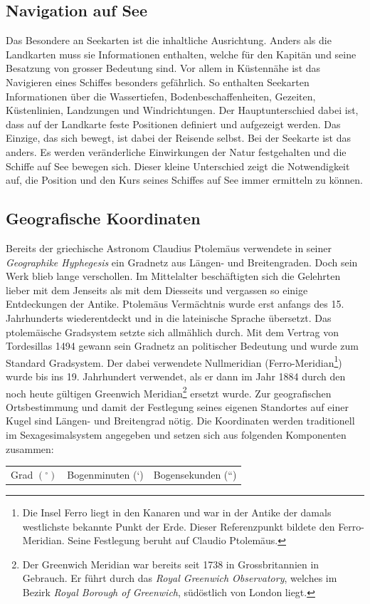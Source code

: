 \begin{refsection}
\section{Navigation auf See}
Das Besondere an Seekarten ist die inhaltliche Ausrichtung. Anders als die Landkarten muss sie Informationen enthalten, welche für den Kapitän und seine Besatzung von grosser Bedeutung sind. Vor allem in Küstennähe ist das Navigieren eines Schiffes besonders gefährlich. So enthalten Seekarten Informationen über die Wassertiefen, Bodenbeschaffenheiten, Gezeiten, Küstenlinien, Landzungen und Windrichtungen.
Der Hauptunterschied dabei ist, dass auf der Landkarte feste Positionen definiert und aufgezeigt werden. Das Einzige, das sich bewegt, ist dabei der Reisende selbst. Bei der Seekarte ist das anders. Es werden veränderliche Einwirkungen der Natur festgehalten und die Schiffe auf See bewegen sich.
Dieser kleine Unterschied zeigt die Notwendigkeit auf, die Position und den Kurs seines Schiffes auf See immer ermitteln zu können.


\subsection{Geografische Koordinaten}
Bereits der griechische Astronom Claudius Ptolemäus verwendete in seiner \textit{Geographike Hyphegesis} ein Gradnetz aus Längen- und Breitengraden. Doch sein Werk  blieb lange verschollen. Im Mittelalter beschäftigten sich die Gelehrten lieber mit dem Jenseits als mit dem Diesseits und vergassen so einige Entdeckungen der Antike.
Ptolemäus Vermächtnis wurde erst anfangs des 15. Jahrhunderts wiederentdeckt und in die lateinische Sprache übersetzt. Das ptolemäische Gradsystem setzte sich allmählich durch.
Mit dem Vertrag von Tordesillas 1494 gewann sein Gradnetz an politischer Bedeutung und wurde zum Standard Gradsystem. Der dabei verwendete Nullmeridian (Ferro-Meridian\footnote{%
Die Insel Ferro liegt in den Kanaren und war in der Antike der damals westlichste bekannte Punkt der Erde. Dieser Referenzpunkt bildete den Ferro-Meridian. Seine Festlegung beruht auf Claudio Ptolemäus.}) wurde bis ins 19. Jahrhundert verwendet, als er dann im Jahr 1884 durch den noch heute gültigen Greenwich Meridian\footnote{%
Der Greenwich Meridian war bereits seit 1738 in Grossbritannien in Gebrauch. Er führt durch das \textit{Royal Greenwich Observatory}, welches im Bezirk \textit{Royal Borough of Greenwich}, südöstlich von London liegt.}
ersetzt wurde.
Zur geografischen Ortsbestimmung und damit der Festlegung seines eigenen Standortes auf einer Kugel sind Längen- und Breitengrad nötig. 
Die Koordinaten werden traditionell im Sexagesimalsystem angegeben und setzen sich aus folgenden Komponenten zusammen:
\begin{center}
\renewcommand{\arraystretch}{1.5}
\begin{tabular}{ccc}
Grad $(^{\circ})$ & Bogenminuten (`) & Bogensekunden (``)
\end{tabular}
\end{center}


\end{refsection}
